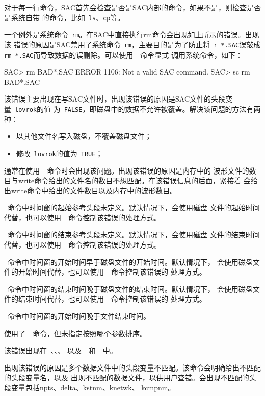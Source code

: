 对于每一行命令，SAC首先会检查是否是SAC内部的命令，如果不是，则检查是否是系统自带
的命令，比如~\verb+ls+、\verb+cp+等。

一个例外是系统命令~\verb+rm+。在SAC中直接执行rm命令会出现如上所示的错误。出现该
错误的原因是SAC禁用了系统命令~\verb+rm+，主要目的是为了防止将~\verb+r *.SAC+误敲成
\verb+rm *.SAC+而导致数据的误删除。可以使用~~命令显式
调用系统命令，如下：
\begin{SACCode}
SAC> rm BAD*.SAC
 ERROR 1106: Not a valid SAC command.
SAC> sc rm BAD*.SAC
\end{SACCode}

该错误主要出现在写SAC文件时，出现该错误的原因是SAC文件的头段变量~\verb+lovrok+的值
为~\verb+FALSE+，即磁盘中的数据不允许被覆盖。解决该问题的方法有两种：
\begin{itemize}
\item 以其他文件名写入磁盘，不覆盖磁盘文件；
\item 修改~\verb+lovrok+的值为~\verb+TRUE+；
\end{itemize}

通常在使用~~命令时会出现该问题。出现该错误的原因是内存中的
波形文件的数目与write命令给出的文件名的数目不想匹配。在该错误信息的后面，紧接着
会给出write命令中给出的文件数目以及内存中的波形数目。

~命令中时间窗的起始参考头段未定义。默认情况下，会使用磁盘
文件的起始时间代替，也可以使用~~命令控制该错误的处理方式。

~命令中时间窗的结束参考头段未定义。默认情况下，会使用磁盘
文件的结束时间代替，也可以使用~~命令控制该错误的处理方式。

~命令中时间窗的开始时间早于磁盘文件的开始时间。默认情况下，
会使用磁盘文件的开始时间代替，也可以使用~~命令控制该错误的
处理方式。

~命令中时间窗的结束时间晚于磁盘文件的结束时间。默认情况下，
会使用磁盘文件的结束时间代替，也可以使用~~命令控制该错误的
处理方式。

~命令中时间窗的开始时间晚于文件结束时间。

使用了~~命令，但未指定按照哪个参数排序。

该错误出现在~、、、
以及~~和~~中。

出现该错误的原因是多个数据文件中的头段变量不匹配。该命令会明确给出不匹配的头段变量名，以及
出现不匹配的数据文件，以供用户查错。会出现不匹配的头段变量包括npts、delta、kstnm、knetwk、
kcmpnm。
